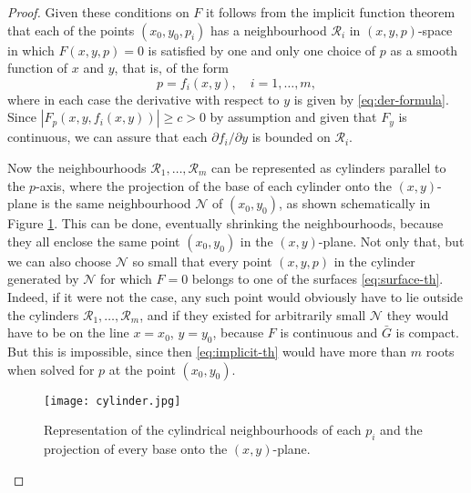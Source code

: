 \begin{proof}
Given these conditions on $F$ it follows from the implicit function theorem that each of the points $(x_0,y_0,p_i)$ has a neighbourhood $\mathcal R_i$ in $(x,y,p)$-space in which $F(x,y,p)=0$ is satisfied by one and only one choice of $p$ as a smooth function of $x$ and $y$, that is, of the form
\begin{equation}\label{eq:surface-th}
  p=f_i(x,y), \quad i=1,\dots,m,
\end{equation}
where in each case the derivative with respect to $y$ is given by \eqref{eq:der-formula}. Since $|F_p(x,y,f_i(x,y))| \ge c > 0$ by assumption and given that $F_y$ is continuous, we can assure that each $\partial f_i/\partial y$ is bounded on $\mathcal R_i$.

Now the neighbourhoods $\mathcal R_1,\dots, \mathcal R_m$ can be represented as cylinders parallel to the $p$-axis, where the projection of the base of each cylinder onto the $(x,y)$-plane is the same neighbourhood $\mathcal N$ of $(x_0,y_0)$, as shown schematically in Figure \ref{fig:cylinder}. This can be done, eventually shrinking the neighbourhoods, because they all enclose the same point $(x_0,y_0)$ in the $(x,y)$-plane. Not only that, but we can also choose $\mathcal N$ so small that every point $(x,y,p)$ in the cylinder generated by $\mathcal N$ for which $F=0$ belongs to one of the surfaces \eqref{eq:surface-th}. Indeed, if it were not the case, any such point would obviously have to lie outside the cylinders $\mathcal R_1, \dots, \mathcal R_m$, and if they existed for arbitrarily small $\mathcal N$ they would have to be on the line $x=x_0$, $y=y_0$, because $F$ is continuous and $\bar{G}$ is compact. But this is impossible, since then \eqref{eq:implicit-th} would have more than $m$ roots when solved for $p$ at the point $(x_0,y_0)$.

\begin{figure}[h!]
\centering
\texttt{[image: cylinder.jpg]}
\caption{Representation of the cylindrical neighbourhoods of each $p_i$ and the projection of every base onto the $(x,y)$-plane.}
\label{fig:cylinder}
\end{figure}


\end{proof}
